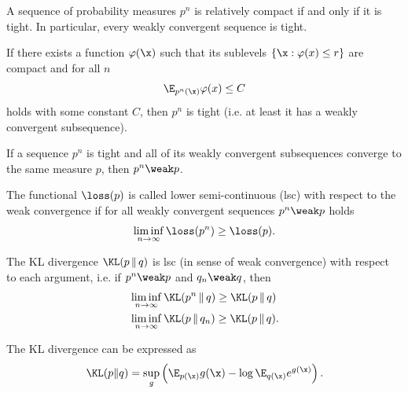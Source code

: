 \begin{theorem}[Prokhorov]
\label{thm:prokhorov}
    A sequence of probability measures $p^n$ is relatively compact if and only if it is tight. In particular, every weakly convergent sequence is tight.
\end{theorem}

\begin{corollary}
\label{thm:prokhorov_bound}
    If there exists a function $\varphi(\x)$ such that its sublevels $\{ \x : \varphi(x) \leq r\}$ are compact and for all $n$
    \[
        \E_{p^n(\x)}\varphi(x) \leq C
    \]
    holds with some constant $C$, then $p^n$ is tight (i.e. at least it has a weakly convergent subsequence).
\end{corollary}

\begin{corollary}
\label{thm:prokhorov_convergence}
    If a sequence $p^n$ is tight and all of its weakly convergent subsequences converge to the same measure $p$, then $p^n \weak p$.
\end{corollary}

\begin{definition}
    The functional $\loss(p)$ is called lower semi-continuous (lsc) with respect to the weak convergence if for all weakly convergent sequences $p^n \weak p$ holds
    \begin{equation}
        \liminf\limits_{n \rightarrow \infty} \loss(p^n) \geq \loss(p).
    \end{equation}
\end{definition}

\begin{theorem}
\label{thm:kl_lsc}
    The \textup{KL} divergence $\textup{\KL}(p \,\|\, q)$ is lsc (in sense of weak convergence) with respect to each argument, i.e. if $p^n \weak p$ and $q_n \weak q$, then
    \begin{align}
        &\liminf\limits_{n \rightarrow \infty} \textup{\KL}(p^n \,\|\, q) \geq \textup{\KL}(p \,\|\, q)\\
        &\liminf\limits_{n \rightarrow \infty} \textup{\KL}(p \,\|\, q_n) \geq \textup{\KL}(p \,\|\, q).
    \end{align}
\end{theorem}

\begin{theorem}
\label{thm:donsker_varadhan}
    The \textup{KL} divergence can be expressed as
    \begin{equation}
    \label{eq:kl_variational}
        \textup{\KL}(p \| q) = \sup\limits_{g} \left(\E_{p(\x)} g(\x) - \log \E_{q(\x)} e^{g(\x)} \right).
    \end{equation}
\end{theorem}

